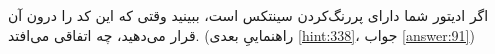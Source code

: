 \section{}
\paragraph{}\label{hint:245}
اگر ادیتور شما دارای پررنگ‌کردن سینتکس است، ببینید وقتی که این کد را درون آن قرار می‌دهید، چه اتفاقی می‌افتد. (راهنماییِ بعدی \ref{hint:338}، جواب \ref{answer:91})